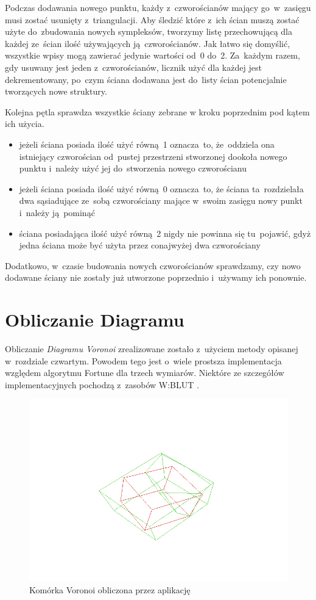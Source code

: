 \documentclass[skorowidz,autorrok,backref,xodstep,oswiadczenie]{wmimgr}
\begin{document}
Podczas dodawania nowego punktu, każdy z~czworościanów mający go~w~zasięgu musi zostać usunięty z~triangulacji. Aby śledzić które z~ich ścian muszą zostać użyte do~zbudowania nowych sympleksów, tworzymy listę przechowującą dla każdej ze~ścian ilość używających ją~czworościanów. Jak łatwo się domyślić, wszystkie wpisy mogą zawierać jedynie wartości od~0 do~2. Za~każdym razem, gdy usuwany jest jeden z~czworościanów, licznik użyć dla każdej jest dekrementowany, po~czym ściana dodawana jest do~listy ścian potencjalnie tworzących nowe struktury.

Kolejna pętla sprawdza wszystkie ściany zebrane w kroku poprzednim pod kątem ich użycia.
\begin{itemize}
\item
jeżeli ściana posiada ilość użyć równą~1 oznacza~to, że~oddziela ona istniejący czworościan od~pustej przestrzeni stworzonej dookoła nowego punktu i~należy użyć jej do~stworzenia nowego czworościanu
\item
jeżeli ściana posiada ilość użyć równą~0 oznacza~to, że ściana ta~rozdzielała dwa sąsiadujące ze~sobą czworościany mające w~swoim zasięgu nowy punkt i~należy ją~pominąć
\item
ściana posiadająca ilość użyć równą~2 nigdy nie powinna się tu~pojawić, gdyż jedna ściana może być użyta przez conajwyżej dwa czworościany
\end{itemize}

Dodatkowo, w~czasie budowania nowych czworościanów sprawdzamy, czy nowo dodawane ściany nie zostały już utworzone poprzednio i~używamy ich ponownie.

\section{Obliczanie Diagramu}

Obliczanie \emph{Diagramu Voronoi} zrealizowane zostało z~użyciem metody opisanej w~rozdziale czwartym. Powodem tego jest o~wiele prostsza implementacja względem algorytmu Fortune dla trzech wymiarów. Niektóre ze szczegółów implementacyjnych pochodzą z~zasobów W:BLUT \cite{fvan}.

\begin{figure}[ht!]
\centering
\includegraphics[width=140mm]{images/app2_1.png}
\caption{Komórka Voronoi obliczona przez aplikację}
\label{appcell}
\end{figure}
\end{document}

